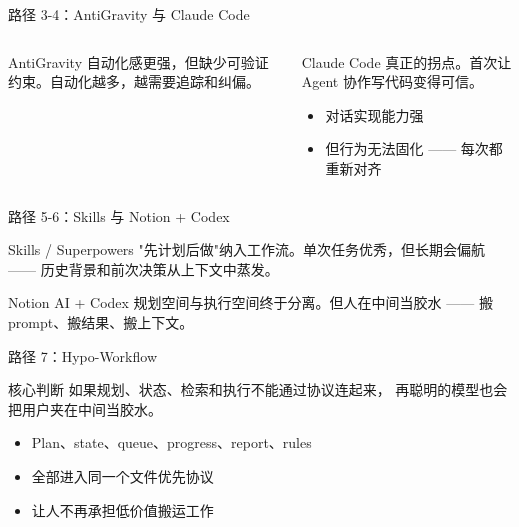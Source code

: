 \documentclass[theme=workflow,aspectratio=169,fontset=tech]{Hypo-Slide}
\begin{document}
\begin{frame}{路径 3-4：AntiGravity 与 Claude Code}
  \begin{columns}[T]
    \begin{block}{AntiGravity}
      自动化感更强，但缺少可验证约束。自动化越多，越需要追踪和纠偏。
    \end{block}
    \begin{block}{Claude Code}
      真正的拐点。首次让 Agent 协作写代码变得可信。
      \begin{itemize}
        \item 对话实现能力强
        \item 但行为无法固化 —— 每次都重新对齐
      \end{itemize}
    \end{block}
  \end{columns}
\end{frame}

\begin{frame}{路径 5-6：Skills 与 Notion + Codex}
  \begin{block}{Skills / Superpowers}
    "先计划后做"纳入工作流。单次任务优秀，但长期会偏航 ——
    历史背景和前次决策从上下文中蒸发。
  \end{block}
  \begin{block}{Notion AI + Codex}
    规划空间与执行空间终于分离。但人在中间当胶水 ——
    搬 prompt、搬结果、搬上下文。
  \end{block}
\end{frame}

\begin{frame}{路径 7：Hypo-Workflow}
  \begin{block}{核心判断}
    如果规划、状态、检索和执行不能通过协议连起来，
    再聪明的模型也会把用户夹在中间当胶水。
  \end{block}
  \begin{itemize}
    \item Plan、state、queue、progress、report、rules
    \item 全部进入同一个文件优先协议
    \item 让人不再承担低价值搬运工作
  \end{itemize}
\end{frame}
\end{document}
